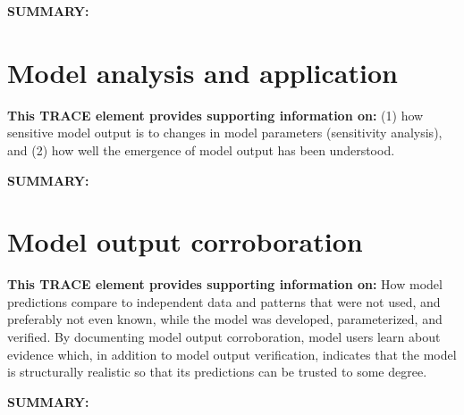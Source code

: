 \documentclass[a4paper, 11pt]{scrartcl}
\begin{document}
\textbf{SUMMARY:}
\begin{addmargin}[3em]{2em}
\textbf{

}
\end{addmargin}



\clearpage
\section{Model analysis and application}
\textbf{This TRACE element provides supporting information on:} (1) how sensitive model output is to changes in model
parameters (sensitivity analysis), and (2) how well the emergence of model output has been understood.

\textbf{SUMMARY:}
\begin{addmargin}[3em]{2em}
\textbf{

}
\end{addmargin}



\clearpage
\section{Model output corroboration}
\textbf{This TRACE element provides supporting information on:} How model predictions compare to independent data and
patterns
that were not used, and preferably not even known, while the model was developed, parameterized, and verified. By
documenting model output corroboration, model users learn about evidence which, in addition to model output
verification, indicates that the model is structurally realistic so that its predictions can be trusted to some degree.

\textbf{SUMMARY:}
\begin{addmargin}[3em]{2em}
\textbf{

}
\end{addmargin}



\newpage
\printbibliography[heading = bibintoc, title = {Contents}]
\end{document}
